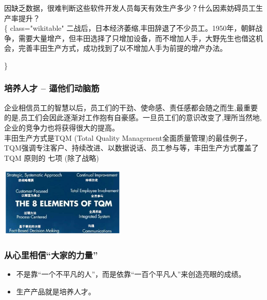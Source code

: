 因缺乏数据，很难判断这些软件开发人员每天有效生产多少？什么因素妨碍员工生产率提升？\\
\{\textbar{} class="wikitable" \textbar{}
二战后，日本经济萎缩,丰田辞退了不少员工。1950年，朝鲜战争，需要大量增产，但丰田选择了只增加设备，而不增加人手，大野先生也借这机会，完善丰田生产方式，成功找到了以不增加人手为前提的增产办法。

\textbar{}\}

\hypertarget{ux57f9ux517bux4ebaux624d---ux903cux4ed6ux4eecux52a8ux8111ux7b4b}{%
\subsubsection{培养人才 --
逼他们动脑筋}\label{ux57f9ux517bux4ebaux624d---ux903cux4ed6ux4eecux52a8ux8111ux7b4b}}


企业相信员工的智慧以后，员工们的干劲、使命感、责任感都会随之而生,最重要的是,员工们会因此逐渐对工作抱有自豪感。一旦员工们的意识改变了,理所当然地,企业的竞争力也将获得很大的提高。\\
丰田生产方式是TQM (Total Quality
Management全面质量管理)的最佳例子，TQM强调专注客户、持续改进、以数据说话、员工参与等，丰田生产方式覆盖了
TQM 原则的 七项 (除了战略)


\includegraphics[width=6cm]{TQM_12.png}

\hypertarget{ux4eceux5fc3ux91ccux76f8ux4fe1ux5927ux5bb6ux7684ux529bux91cf}{%
\subsubsection{从心里相信``大家的力量''}\label{ux4eceux5fc3ux91ccux76f8ux4fe1ux5927ux5bb6ux7684ux529bux91cf}}

\begin{itemize}
\tightlist
\item
  不是靠``一个不平凡的人''，而是依靠``一百个平凡人''来创造亮眼的成绩。
\item
  生产产品就是培养人才。
\end{itemize}

